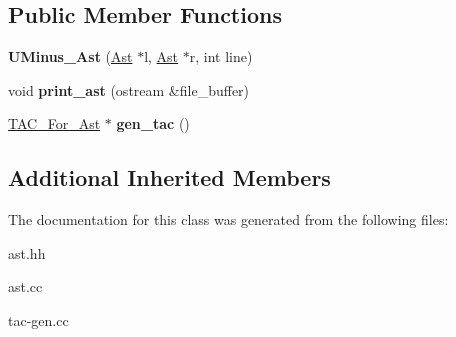 \subsection*{Public Member Functions}
\begin{DoxyCompactItemize}
\item 
\mbox{\label{classUMinus__Ast_a18eab5f9565124a8c85b1b8f7d9e0ffb}} 
{\bfseries U\+Minus\+\_\+\+Ast} (\hyperlink{classAst}{Ast} $\ast$l, \hyperlink{classAst}{Ast} $\ast$r, int line)
\item 
\mbox{\label{classUMinus__Ast_a8838db5352455293728b511f619ae8b2}} 
void {\bfseries print\+\_\+ast} (ostream \&file\+\_\+buffer)
\item 
\mbox{\label{classUMinus__Ast_a019c50b9ace1f4751ef8a1b21d3b817f}} 
\hyperlink{classTAC__For__Ast}{T\+A\+C\+\_\+\+For\+\_\+\+Ast} $\ast$ {\bfseries gen\+\_\+tac} ()
\end{DoxyCompactItemize}
\subsection*{Additional Inherited Members}


The documentation for this class was generated from the following files\+:\begin{DoxyCompactItemize}
\item 
ast.\+hh\item 
ast.\+cc\item 
tac-\/gen.\+cc\end{DoxyCompactItemize}
